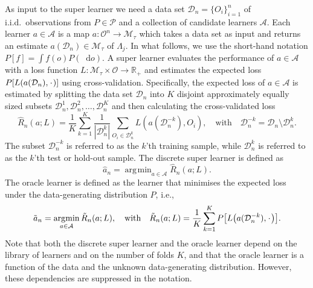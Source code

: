 \documentclass[11pt]{article}
\theoremstyle{thmstyleone}%
\theoremstyle{thmstyletwo}%
\theoremstyle{thmstylethree}%
\newcommand{\R}{\mathbb{R}}
\newcommand{\blank}{\makebox[1ex]{\textbf{$\cdot$}}}
\newcommand*\diff{\mathop{}\!\mathrm{d}}
\newcommand{\1}{\mathds{1}}
\DeclareMathOperator*{\argmin}{\arg\!\min}
\newcommand{\empmeas}{\ensuremath{\mathbb{P}_n}} %
\newcommand{\data}{\ensuremath{\mathcal{D}}}
\begin{document}
As input to the super learner we need a data set
\( \data_n=\{O_i\}_{i=1}^n \) of i.i.d.\ observations from \( P \in \mathcal{P} \) and a collection of candidate
learners $\mathcal{A}$. Each learner \(a \in \mathcal{A}\) is a map
\( a \colon \mathcal{O}^n \rightarrow \mathcal{M}_{\tau}\) which takes a data
set as input and returns an estimate $a(\data_n) \in \mathcal{M}_{\tau}$ of
$\Lambda_{j}$.
In what follows, we use the short-hand notation
\(P[f] = \int f(o) P(\diff o) \). A super learner evaluates the
performance of \(a \in \mathcal{A}\) with a loss function
\(L\colon \mathcal{M}_{\tau} \times \mathcal{O} \rightarrow \R_+\) and
estimates the expected loss \(P[L(a(\data_n), \blank)]\) using
cross-validation. Specifically, the expected loss of $a\in\mathcal A$
is estimated by splitting the data set $\data_n$ into $K$ disjoint
approximately equally sized subsets
\(\data_n^1, \data_n^2, \dots, \data_n^K \) and then calculating the
cross-validated loss
\begin{equation*}
  \hat{R}_n(a; L) =
  \frac{1}{K}\sum_{k=1}^{K}
  \frac{1}{| \data_n^{k} |}\sum_{O_i \in \data_n^{k}}
  L
  {
    \left(
      a{ (\data_n^{-k})}
      , O_i
    \right)
  },
  \quad \text{with} \quad
  \data_n^{-k} = \data_n \setminus \data_n^{k}.
\end{equation*}
The subset \(\data_n^{-k}\) is referred to as the \(k\)'th training
sample, while \(\data_n^{k}\) is referred to as the \(k\)'th test or
hold-out sample.
The discrete super learner is defined as
\begin{equation*}
\hat{a}_n = \argmin_{a\in\mathcal A}\hat{R}_n(a; L).
\end{equation*}
The oracle learner is defined as the learner that minimises the
expected loss under the data-generating distribution \( P \),
i.e.,
\begin{equation*}
  \tilde{a}_n =
  \argmin_{a \in \mathcal{A}}
  \tilde{R}_n(a; L),
  \quad \text{with} \quad 
  \tilde{R}_n(a; L)=
  \frac{1}{K}\sum_{k=1}^{K} 
  P{
    \left[
      L
      {
        \left(
          a{ (\data_n^{-k})}
          , \blank
        \right)
      }
    \right]}
  .
\end{equation*}
Note that both the discrete super learner and the oracle learner
depend on the library of learners and on the number of folds \(K\),
and that the oracle learner is a function of the data and the unknown
data-generating distribution. However, these dependencies are
suppressed in the notation.
\end{document}
